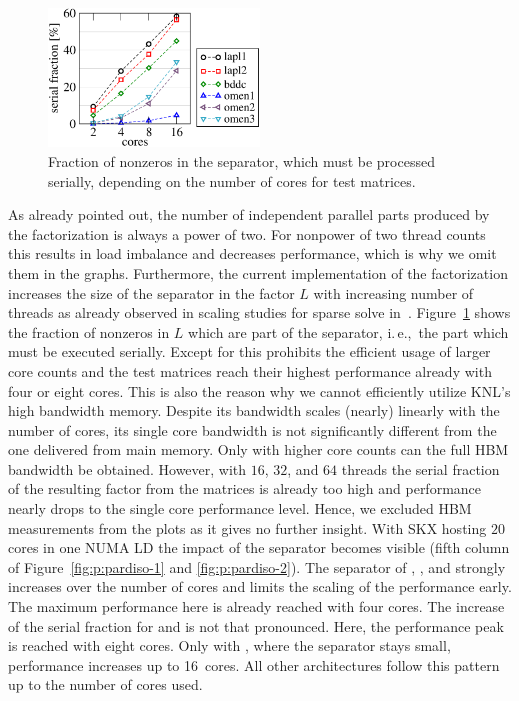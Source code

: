 \begin{figure}[t]%
  \centering%
  \includegraphics[width=0.5\textwidth,clip=true]{images/matrices-serial-fraction}%
  \caption{Fraction of nonzeros in the separator, which must be processed
   serially, depending on the number of cores for test matrices.  }%
  \label{fig:p:serial-fraciton}%
\end{figure}

As already pointed out, the number of independent parallel parts produced by the
factorization is always a power of two.
For nonpower of two thread counts this results in load imbalance and decreases
performance, which is why we omit them in the graphs.
%
Furthermore, the current implementation of the factorization increases the size
of the separator in the factor $L$ with increasing number of threads as already
observed in scaling studies for sparse solve in~\cite{klawonn-2015}.
%
Figure~\ref{fig:p:serial-fraciton} shows the fraction of nonzeros in $L$ which are
part of the separator, i.\,e.,\ the part which must be executed serially.
Except for  this prohibits the efficient usage of larger core
counts and the test matrices reach their highest performance already with four
or eight cores.
%
This is also the reason why we cannot efficiently utilize KNL's high bandwidth
memory.
Despite its bandwidth scales (nearly) linearly with the number of cores, its
single core bandwidth is not significantly different from the one delivered from
main memory.
Only with higher core counts can the full HBM bandwidth be obtained.
However, with $16$, $32$, and $64$ threads the serial fraction of the resulting
factor from the matrices is already too high and performance nearly drops to
the single core performance level.
Hence, we excluded HBM measurements from the plots as it gives no further
insight.
%
With SKX hosting $20$ cores in one NUMA LD the impact of the separator becomes
visible (fifth column of Figure~\ref{fig:p:pardiso-1} and \ref{fig:p:pardiso-2}).
The separator of , , and \/ strongly increases 
over the number of cores and limits the scaling of the performance early.
The maximum performance here is already reached with four cores.
The increase of the serial fraction for  and  is not
that pronounced.
Here, the performance peak is reached with eight cores.
Only with , where the separator stays small, performance increases
up to 16~cores.
All other architectures follow this pattern up to the number of cores used.

